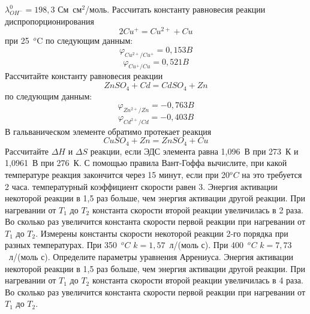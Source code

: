 $\lambda_{OH^{-}}^{0}=198,3$ См~см$^{2}$/моль.
\endQvery
\Qvery 
Рассчитать константу равновесия реакции диспропорционирования
$$2Cu^{+}=Cu^{2+}+Cu$$
при 25~$^{o}$C по следующим данным:
$$\varphi_{Cu^{2+}/Cu^{+}}=0,153 B $$
$$\varphi_{Cu^{+}/Cu}=0,521 B$$
\endQvery
\Qvery 
Рассчитайте константу равновесия реакции
$$ZnSO_{4}+Cd=CdSO_{4}+Zn$$
по следующим данным:
$$\varphi_{Zn^{2+}/Zn}=-0,763 B $$
$$\varphi_{Cd^{2+}/Cd}=-0,403 B$$
\endQvery
\Qvery 
В гальваническом элементе обратимо протекает реакция
$$CuSO_{4}+Zn=ZnSO_{4}+Cu$$
Рассчитайте $\Delta H$ и $\Delta S$ реакции, если ЭДС элемента равна 1,096~В при 273~К и 1,0961~В при 276~К.
\endQvery
\Qvery 
С помощью правила Вант-Гоффа вычислите, при какой температуре реакция закончится через 15 минут, если  при 20$^{o}C$ на это требуется 2 часа. температурный коэффициент скорости равен 3.
\endQvery
\Qvery 
Энергия активации некоторой реакции в 1,5 раз больше, чем энергия активации другой реакции. При нагревании от $T_{1}$ до $T_{2}$ константа скорости второй реакции увеличилась в 2 раза. Во сколько раз увеличится константа скорости первой реакции при нагревании от  $T_{1}$ до $T_{2}$.
\endQvery
\Qvery 
Измерены константы скорости некоторой реакции 2-го порядка при разных температурах. При 350~$^{o}C$ $k=1,57$~л/(моль с).  При 400~$^{o}C$ $k=7,73$~л/(моль с). Определите параметры уравнения Аррениуса.
\endQvery
\Qvery 
Энергия активации некоторой реакции в 1,5 раз больше, чем энергия активации другой реакции. При нагревании от $T_{1}$ до $T_{2}$ константа скорости второй реакции увеличилась в 4 раза. Во сколько раз увеличится константа скорости первой реакции при нагревании от  $T_{1}$ до $T_{2}$.
\endQvery